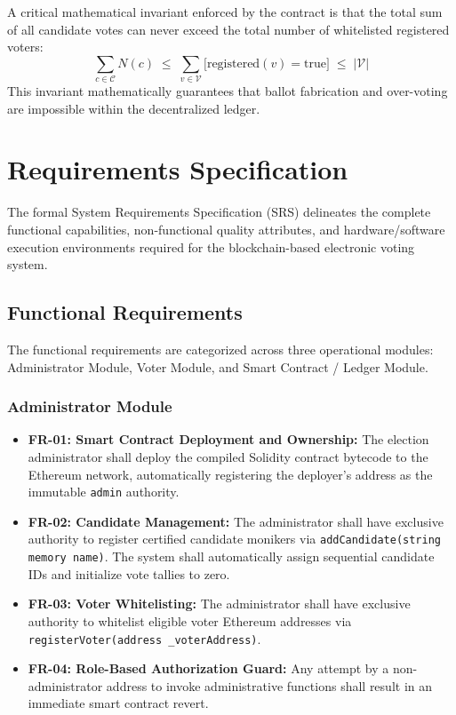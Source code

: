 \documentclass[12pt,a4paper]{report}
\begin{document}
A critical mathematical invariant enforced by the contract is that the total sum of all candidate votes can never exceed the total number of whitelisted registered voters:
\begin{equation}
    \sum_{c \in \mathcal{C}} N(c) \;\le\; \sum_{v \in \mathcal{V}} \Big[ \text{registered}(v) = \text{true} \Big] \;\le\; |\mathcal{V}|
    \label{eq:tally_invariant}
\end{equation}
This invariant mathematically guarantees that ballot fabrication and over-voting are impossible within the decentralized ledger.

\chapter{Requirements Specification}

The formal System Requirements Specification (SRS) delineates the complete functional capabilities, non-functional quality attributes, and hardware/software execution environments required for the blockchain-based electronic voting system.

\section{Functional Requirements}
The functional requirements are categorized across three operational modules: Administrator Module, Voter Module, and Smart Contract / Ledger Module.

\subsection{Administrator Module}
\begin{itemize}
    \item \textbf{FR-01: Smart Contract Deployment and Ownership:} The election administrator shall deploy the compiled Solidity contract bytecode to the Ethereum network, automatically registering the deployer's address as the immutable \texttt{admin} authority.
    \item \textbf{FR-02: Candidate Management:} The administrator shall have exclusive authority to register certified candidate monikers via \texttt{addCandidate(string memory name)}. The system shall automatically assign sequential candidate IDs and initialize vote tallies to zero.
    \item \textbf{FR-03: Voter Whitelisting:} The administrator shall have exclusive authority to whitelist eligible voter Ethereum addresses via \texttt{registerVoter(address \_voterAddress)}.
    \item \textbf{FR-04: Role-Based Authorization Guard:} Any attempt by a non-administrator address to invoke administrative functions shall result in an immediate smart contract revert.
\end{itemize}
\end{document}
